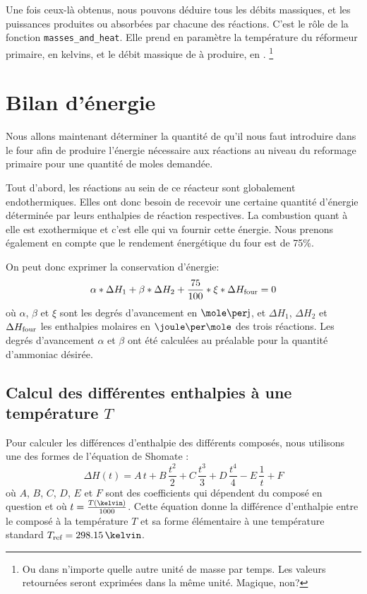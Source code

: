 Une fois ceux-là obtenus, nous pouvons déduire tous
les débits massiques,
et les puissances produites ou absorbées par chacune des réactions.
C'est le rôle de la fonction \texttt{masses\_and\_heat}.
Elle prend en paramètre la température du réformeur primaire, en kelvins,
et le débit massique de  à produire, en \kilogram\per\second.%
\footnote{Ou dans n'importe quelle autre unité de masse par temps.
Les valeurs retournées seront exprimées dans la même unité. Magique, non?}

\section{Bilan d'énergie}

Nous allons maintenant déterminer la quantité de  qu’il nous faut introduire
dans le four afin de produire l’énergie nécessaire aux réactions
au niveau du reformage primaire pour une quantité de moles demandée.

Tout d’abord, les réactions au sein de ce réacteur sont globalement endothermiques.
Elles ont donc besoin de recevoir une certaine quantité d’énergie
déterminée par leurs enthalpies de réaction respectives.
La combustion quant à elle est exothermique et c’est elle qui va fournir cette énergie.
Nous prenons également en compte que le rendement énergétique du four est de 75\%.

On peut donc exprimer la conservation d'énergie:
$$\alpha*\Delta H_1 + \beta*\Delta H_2 + \frac{75}{100}*\xi*\Delta H_{\mbox{\scriptsize{four}}} = 0$$
où $\alpha$, $\beta$ et $\xi$ sont les degrés d'avancement en $\mole\per\jour$,
et $\Delta H_1$, $\Delta H_2$ et $\Delta H_{\mbox{\scriptsize{four}}}$ les enthalpies molaires en
$\joule\per\mole$ des trois réactions.
Les degrés d'avancement $\alpha$ et $\beta$ ont été calculées
au préalable pour la quantité d’ammoniac désirée.

\subsection{Calcul des différentes enthalpies à une température $T$}

Pour calculer les différences d'enthalpie des différents composés,
nous utilisons une des formes de l'équation de Shomate \cite{nist}:
$$\Delta H(t) = A\,t + B\,\frac{t^2}{2} + C\,\frac{t^3}{3}
+ D\,\frac{t^4}{4} - E\,\frac{1}{t} + F$$
où $A$, $B$, $C$, $D$, $E$ et $F$ sont des coefficients
qui dépendent du composé en question et où $t=\frac{T(\kelvin)}{1000}$.
Cette équation donne la différence d'enthalpie entre le composé à la température $T$
et sa forme élémentaire à une température standard $T\ind{ref} = 298.15\,\kelvin$.

